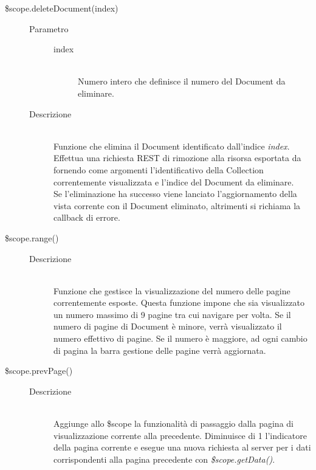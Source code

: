 \begin{description}
\begin{description}
  \item[\$scope.deleteDocument(index)] \hfill 
  \begin{description}
  	\item[Parametro] \hfill
  	\begin{description}
  		\item[index] \hfill \\
  		Numero intero che definisce il numero del Document da eliminare.
  	\end{description}
  	\item[Descrizione] \hfill \\
  Funzione che elimina il Document identificato dall'indice \textit{index}. Effettua una richiesta REST di rimozione alla risorsa esportata da  fornendo come argomenti l'identificativo della Collection correntemente visualizzata e l'indice del Document da eliminare. \\
  Se l'eliminazione ha successo viene lanciato l'aggiornamento della vista corrente con il Document eliminato, altrimenti si richiama la callback di errore.
  \end{description}
  
  \item[\$scope.range()] \hfill
  \begin{description}
  	\item[Descrizione] \hfill \\
  	Funzione che gestisce la visualizzazione del numero delle pagine correntemente esposte. Questa funzione impone che sia visualizzato un numero massimo di 9 pagine tra cui navigare per volta. Se il numero di pagine di Document è minore, verrà visualizzato il numero effettivo di pagine. Se il numero è maggiore, ad ogni cambio di pagina la barra gestione delle pagine verrà aggiornata.
  \end{description}
  
  \item[\$scope.prevPage()] \hfill 
  \begin{description}
  		\item[Descrizione] \hfill \\
  Aggiunge allo \$scope la funzionalità di passaggio dalla pagina di visualizzazione corrente alla precedente. Diminuisce di 1 l'indicatore della pagina corrente e esegue una nuova richiesta al server per i dati corrispondenti alla pagina precedente con \textit{\$scope.getData()}.
  \end{description}
  

\end{description}
\end{description}

